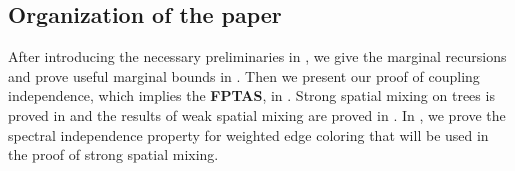 \subsection{Organization of the paper}

After introducing the necessary preliminaries in , we give the marginal recursions and prove useful marginal bounds in . Then we present our proof of coupling independence, which implies the \textbf{FPTAS}, in . Strong spatial mixing on trees is proved in  and the results of weak spatial mixing are proved in . In , we prove the spectral independence property for weighted edge coloring that will be used in the proof of strong spatial mixing.

